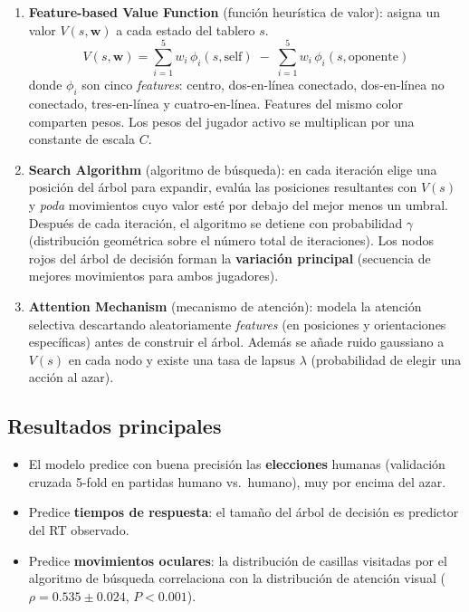 \documentclass[11pt, a4paper]{article}
\begin{document}
\begin{enumerate}[nosep]
    \item \textbf{Feature-based Value Function} (funci\'on heur\'istica de valor): asigna un valor $V(s, \mathbf{w})$ a cada estado del tablero $s$.
    \[
        V(s, \mathbf{w}) = \sum_{i=1}^{5} w_i \, \phi_i(s, \text{self}) \;-\; \sum_{i=1}^{5} w_i \, \phi_i(s, \text{oponente})
    \]
    donde $\phi_i$ son cinco \emph{features}: centro, dos-en-l\'inea conectado, dos-en-l\'inea no conectado, tres-en-l\'inea y cuatro-en-l\'inea. Features del mismo color comparten pesos. Los pesos del jugador activo se multiplican por una constante de escala $C$.

    \item \textbf{Search Algorithm} (algoritmo de b\'usqueda): en cada iteraci\'on elige una posici\'on del \'arbol para expandir, eval\'ua las posiciones resultantes con $V(s)$ y \emph{poda} movimientos cuyo valor est\'e por debajo del mejor menos un umbral. Despu\'es de cada iteraci\'on, el algoritmo se detiene con probabilidad $\gamma$ (distribuci\'on geom\'etrica sobre el n\'umero total de iteraciones). Los nodos rojos del \'arbol de decisi\'on forman la \textbf{variaci\'on principal} (secuencia de mejores movimientos para ambos jugadores).

    \item \textbf{Attention Mechanism} (mecanismo de atenci\'on): modela la atenci\'on selectiva descartando aleatoriamente \emph{features} (en posiciones y orientaciones espec\'ificas) antes de construir el \'arbol. Adem\'as se a\~nade ruido gaussiano a $V(s)$ en cada nodo y existe una tasa de lapsus $\lambda$ (probabilidad de elegir una acci\'on al azar).
\end{enumerate}

\subsection{Resultados principales}

\begin{itemize}[nosep]
    \item El modelo predice con buena precisi\'on las \textbf{elecciones} humanas (validaci\'on cruzada 5-fold en partidas humano vs.\ humano), muy por encima del azar.
    \item Predice \textbf{tiempos de respuesta}: el tama\~no del \'arbol de decisi\'on es predictor del RT observado.
    \item Predice \textbf{movimientos oculares}: la distribuci\'on de casillas visitadas por el algoritmo de b\'usqueda correlaciona con la distribuci\'on de atenci\'on visual ($\rho = 0.535 \pm 0.024$, $P < 0.001$).
\end{itemize}
\end{document}
